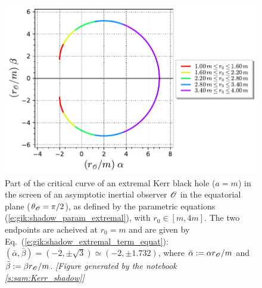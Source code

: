\begin{figure}
\centerline{
\includegraphics[height=0.28\textheight]{gik_shadow_a1_th90_part.pdf} }
\caption[]{\label{f:gik:shadow_a1_th90_part} \footnotesize
Part of the critical curve of an extremal Kerr black hole ($a=m$) in the
screen of an asymptotic inertial observer $\mathscr{O}$ in the equatorial plane
($\theta_{\mathscr{O}} = \pi/2$), as defined by the
parametric equations (\ref{e:gik:shadow_param_extremal}), with $r_0\in[m, 4m]$.
The two endpoints are acheived at $r_0=m$ and are given by Eq.~(\ref{e:gik:shadow_extremal_term_equat}):
$(\bar{\alpha},\bar{\beta}) = (-2, \pm \sqrt{3}) \simeq (-2, \pm 1.732)$, where
$\bar{\alpha}:= \alpha r_{\mathscr{O}}/m$ and $\bar{\beta}:= \beta r_{\mathscr{O}}/m$.
\textsl{[Figure generated by the notebook \ref{s:sam:Kerr_shadow}]}
}
\end{figure}

